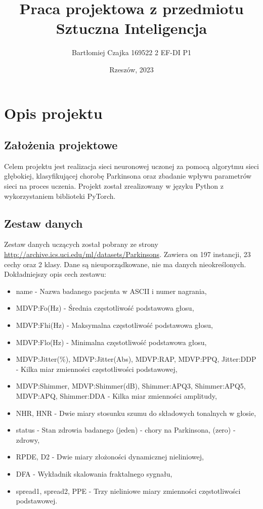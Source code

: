 \documentclass[a4paper]{article}
\title{\textbf{Praca projektowa z przedmiotu Sztuczna Inteligencja}}
\author{Bartłomiej Czajka 169522 2 EF-DI P1}
\date{Rzeszów, 2023}
\begin{document}
\maketitle
\pagebreak


\tableofcontents{}
\newpage
\section{Opis projektu}
\subsection{Założenia projektowe}
Celem projektu jest realizacja sieci neuronowej uczonej za pomocą algorytmu sieci głębokiej, klasyfikującej chorobę Parkinsona oraz zbadanie wpływu parametrów sieci na proces uczenia.
Projekt został zrealizowany w języku Python z wykorzystaniem biblioteki PyTorch.
\subsection{Zestaw danych}
Zestaw danych uczących został pobrany ze strony \href{http://archive.ics.uci.edu/ml/datasets/Parkinsons}{http://archive.ics.uci.edu/ml/datasets/Parkinsons}.
Zawiera on 197 instancji, 23 cechy oraz 2 klasy. Dane są nieuporządkowane, nie ma danych nieokreślonych.
Dokładniejszy opis cech zestawu:
\begin{itemize}
    \item name - Nazwa badanego pacjenta w ASCII i numer nagrania,
    \item MDVP:Fo(Hz) - Średnia częstotliwość podstawowa głosu,
    \item MDVP:Fhi(Hz) - Maksymalna częstotliwość podstawowa głosu,
    \item MDVP:Flo(Hz) - Minimalna częstotliwość podstawowa głosu,
    \item MDVP:Jitter(\%), MDVP:Jitter(Abs), MDVP:RAP, MDVP:PPQ, Jitter:DDP - Kilka miar zmienności częstotliwości podstawowej,
    \item MDVP:Shimmer, MDVP:Shimmer(dB), Shimmer:APQ3, Shimmer:APQ5, MDVP:APQ, Shimmer:DDA - Kilka miar zmienności amplitudy,
    \item NHR, HNR - Dwie miary stosunku szumu do składowych tonalnych w głosie,
    \item status - Stan zdrowia badanego (jeden) - chory na Parkinsona, (zero) - zdrowy,
    \item RPDE, D2 - Dwie miary złożoności dynamicznej nieliniowej,
    \item DFA - Wykładnik skalowania fraktalnego sygnału,
    \item spread1, spread2, PPE - Trzy nieliniowe miary zmienności częstotliwości podstawowej.
\end{itemize}
\end{document}
